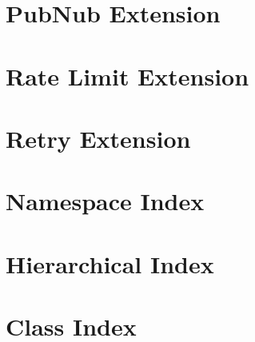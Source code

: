 \let\mypdfximage\pdfximage\def\pdfximage{\immediate\mypdfximage}\documentclass[twoside]{book}
\newcommand{\+}{\discretionary{\mbox{\scriptsize$\hookleftarrow$}}{}{}}
\begin{document}
\chapter{Pub\+Nub Extension}
\label{md_RingCentral_Net_PubnubPCL_README}

\chapter{Rate Limit Extension}
\label{md_RingCentral_Net_RateLimit_README}

\chapter{Retry Extension}
\label{md_RingCentral_Net_Retry_README}

\chapter{Namespace Index}

\chapter{Hierarchical Index}

\chapter{Class Index}

\end{document}
